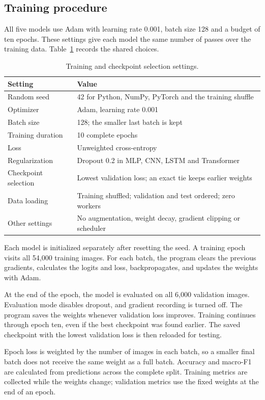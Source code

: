 \clearpage
\subsection{Training procedure}
All five models use Adam \cite{fresh_adam} with learning rate 0.001, batch size
128 and a budget of ten epochs. These settings give each model the same number
of passes over the training data. Table~\ref{tab:fresh_training} records the
shared choices.

\begin{table}[h]
\centering
\caption{Training and checkpoint selection settings.}
\label{tab:fresh_training}
\begin{tabularx}{\linewidth}{l X}
\toprule
Setting & Value\\
\midrule
Random seed & 42 for Python, NumPy, PyTorch and the training shuffle\\
Optimizer & Adam, learning rate 0.001\\
Batch size & 128; the smaller last batch is kept\\
Training duration & 10 complete epochs\\
Loss & Unweighted cross-entropy\\
Regularization & Dropout 0.2 in MLP, CNN, LSTM and Transformer\\
Checkpoint selection & Lowest validation loss; an exact tie keeps earlier weights\\
Data loading & Training shuffled; validation and test ordered; zero workers\\
Other settings & No augmentation, weight decay, gradient clipping or scheduler\\
\bottomrule
\end{tabularx}
\end{table}

Each model is initialized separately after resetting the seed. A training epoch
visits all 54,000 training images. For each batch, the program clears the
previous gradients, calculates the logits and loss, backpropagates, and updates
the weights with Adam.

At the end of the epoch, the model is evaluated on all 6,000 validation images.
Evaluation mode disables dropout, and gradient recording is turned off.
The program saves the weights whenever validation loss improves. Training
continues through epoch ten, even if the best checkpoint was found earlier.
The saved checkpoint with the lowest validation loss is then reloaded for
testing.

Epoch loss is weighted by the number of images in each batch, so a smaller final
batch does not receive the same weight as a full batch. Accuracy and macro-F1
are calculated from predictions across the complete split. Training metrics
are collected while the weights change; validation metrics use the fixed
weights at the end of an epoch.


